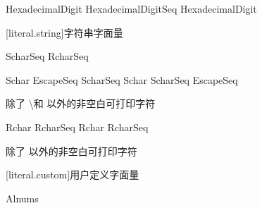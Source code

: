 \begin{bnf}
 \br
    HexadecimalDigit \br
    HexadecimalDigitSeq HexadecimalDigit
\end{bnf}

[literal.string]{字符串字面量}

\begin{bnf}
 \br
    \terminal{\textquotedbl} ScharSeq\bnfq \terminal{\textquotedbl} \br
     RcharSeq\bnfq \terminal{\textquotedbl}
\end{bnf}

\begin{bnf}
 \br
    Schar \br
    EscapeSeq \br
    ScharSeq Schar \br
    ScharSeq EscapeSeq
\end{bnf}

\begin{bnf}
 \br
    \textnormal{除了 \textbackslash 和 \textquotedbl 以外的非空白可打印字符}
\end{bnf}

\begin{bnf}
 \br
    Rchar \br
    \terminal{\textquotedbl\textquotedbl} \br
    RcharSeq Rchar \br
    RcharSeq \terminal{\textquotedbl\textquotedbl}
\end{bnf}

\begin{bnf}
 \br
    \textnormal{除了 \textquotedbl 以外的非空白可打印字符}
\end{bnf}

[literal.custom]{用户定义字面量}

\begin{bnf}
 \br
    \terminal{\_} Alnums
\end{bnf}
